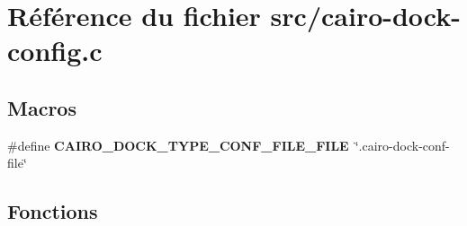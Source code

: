 \section{R\'{e}f\'{e}rence du fichier src/cairo-dock-config.c}
\label{cairo-dock-config_8c}
\subsection*{Macros}
\begin{CompactItemize}
\item 
\#define {\bf CAIRO\_\-DOCK\_\-TYPE\_\-CONF\_\-FILE\_\-FILE}~\char`\"{}.cairo-dock-conf-file\char`\"{}
\end{CompactItemize}
\subsection*{Fonctions}
